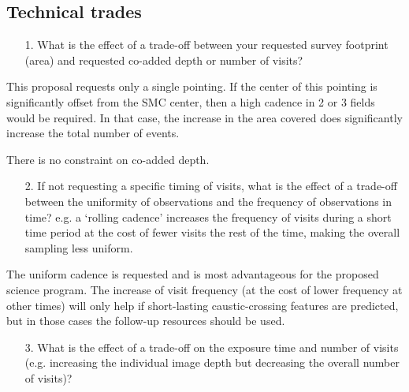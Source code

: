 \documentclass[12pt,letterpaper]{article}
\begin{document}
\subsection{Technical trades}
\begin{footnotesize}
\begin{enumerate}
    \item[1.] What is the effect of a trade-off between your requested survey footprint (area) and requested co-added depth or number of visits?
\end{enumerate}
\end{footnotesize}

This proposal requests only a single pointing.  If the center of this pointing is significantly offset from 
the SMC center, then a high cadence in 2 or 3 fields would be required.  
In that case, the increase in the area covered does significantly increase the total number of events.

There is no constraint on co-added depth. 

\begin{footnotesize}
\begin{enumerate}
    \item[2.] If not requesting a specific timing of visits, what is the effect of a trade-off between the uniformity of observations and the frequency of observations in time? e.g. a `rolling cadence' increases the frequency of visits during a short time period at the cost of fewer visits the rest of the time, making the overall sampling less uniform.
\end{enumerate}
\end{footnotesize}

The uniform cadence is requested and is most advantageous for the proposed 
science program.  The increase of visit frequency (at the cost of lower 
frequency at other times) will only help if short-lasting caustic-crossing 
features are predicted, but in those cases the follow-up resources should be used.

\begin{footnotesize}
\begin{enumerate}
    \item[3.] What is the effect of a trade-off on the exposure time and number of visits (e.g. increasing the individual image depth but decreasing the overall number of visits)?
\end{enumerate}
\end{footnotesize}
\end{document}
